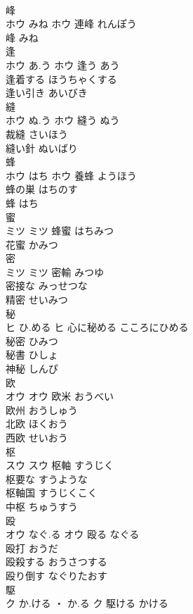 \documentclass[8pt]{extreport}
\begin{document}
\begin{CJK}{UTF8}{min}
\\	峰	
\\	ホウ	みね	ホウ	連峰	れんぽう	
\\	峰	みね	
\\	逢	
\\	ホウ	あ.う	ホウ	逢う	あう	
\\	逢着する	ほうちゃくする	
\\	逢い引き	あいびき	
\\	縫	
\\	ホウ	ぬ.う	ホウ	縫う	ぬう	
\\	裁縫	さいほう	
\\	縫い針	ぬいばり	
\\	蜂	
\\	ホウ	はち	ホウ													養蜂	ようほう	
\\	蜂の巣	はちのす	
\\	蜂	はち	
\\	蜜	
\\	ミツ		ミツ	蜂蜜	はちみつ	
\\	花蜜	かみつ	
\\	密	
\\	ミツ		ミツ	密輸	みつゆ	
\\	密接な	みっせつな	
\\	精密	せいみつ	
\\	秘	
\\	ヒ	ひ.める	ヒ	心に秘める	こころにひめる	
\\	秘密	ひみつ	
\\	秘書	ひしょ	
\\	神秘	しんぴ	
\\	欧	
\\	オウ		オウ	欧米	おうべい	
\\	欧州	おうしゅう	
\\	北欧	ほくおう	
\\	西欧	せいおう	
\\	枢	
\\	スウ		スウ	枢軸	すうじく	
\\	枢要な	すうような	
\\	枢軸国	すうじくこく	
\\	中枢	ちゅうすう	
\\	殴	
\\	オウ	なぐ.る	オウ	殴る	なぐる	
\\	殴打	おうだ	
\\	殴殺する	おうさつする	
\\	殴り倒す	なぐりたおす	
\\	駆	
\\	ク	か.ける ・ か.る	ク	駆ける	かける	

\end{CJK}
\end{document}
